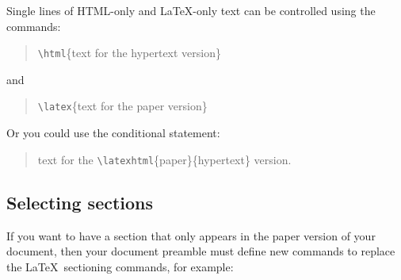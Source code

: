\documentclass[twoside,11pt]{article}
\newcommand{\latex}[1]{#1}
\newcommand{\html}[1]{}
\newcommand{\latexhtml}[2]{#1}
\newcommand{\xlabel}[1]{}
\renewcommand{\_}{\texttt{\symbol{95}}}
\begin{document}
Single lines of HTML-only and \LaTeX\--only text can be controlled
using the commands:
\begin{quote}
\verb!\html!\{text for the hypertext version\}
\end{quote}
and
\begin{quote}
\verb!\latex!\{text for the paper version\}
\end{quote}
Or you could use the conditional statement:
\begin{quote}
text for the \verb!\latexhtml!\{paper\}\{hypertext\} version.
\end{quote}

\subsection{\xlabel{selecting_sections}\label{selecting_sections}Selecting sections}

If you want to have a section that only appears in the paper version
of your document, then your document preamble must define new commands
to replace the \LaTeX\ sectioning commands, for example:
\end{document}
